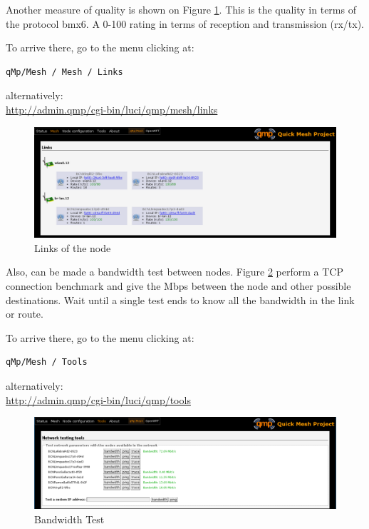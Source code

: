 \documentclass[11pt]{article}
\begin{document}
Another measure of quality is shown on Figure \ref{fig:links-node}. This is the
quality in terms of the protocol bmx6. A 0-100 rating in terms of
reception and transmission (rx/tx).

\noindent
To arrive there, go to the menu clicking at:
\begin{verbatim}
qMp/Mesh / Mesh / Links
\end{verbatim}
alternatively:\\
\url{http://admin.qmp/cgi-bin/luci/qmp/mesh/links}

\begin{figure}[htb]
\centering
\includegraphics[width=.9\linewidth]{./img/qMp-basics-scrot/links.png}
\caption{\label{fig:links-node}Links of the node}
\end{figure}

Also, can be made a bandwidth test between nodes. Figure \ref{fig:bw-test}
perform a TCP connection benchmark and give the Mbps between the node
and other possible destinations. Wait until a single test ends to know
all the bandwidth in the link or route.

\noindent
To arrive there, go to the menu clicking at:
\begin{verbatim}
qMp/Mesh / Tools
\end{verbatim}
alternatively:\\
\url{http://admin.qmp/cgi-bin/luci/qmp/tools}

\begin{figure}[htb]
\centering
\includegraphics[width=.9\linewidth]{./img/qMp-basics-scrot/test-bandwidth.png}
\caption{\label{fig:bw-test}Bandwidth Test}
\end{figure}
\end{document}
